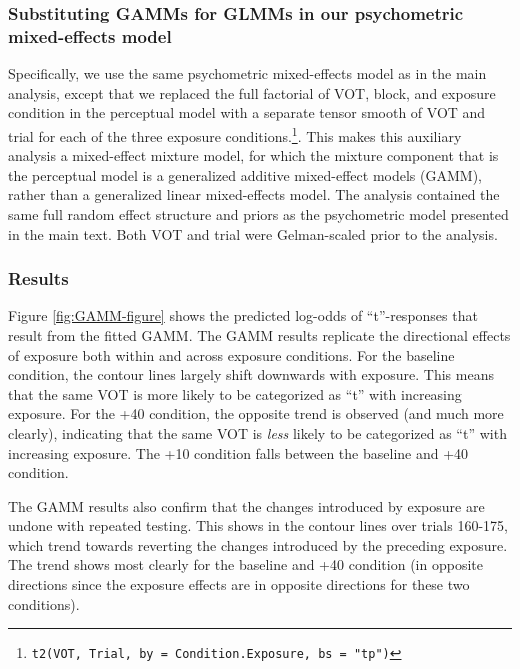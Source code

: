 \documentclass[
  11pt,
  man,mask,floatsintext]{apa6}
\begin{document}
\subsubsection{Substituting GAMMs for GLMMs in our psychometric mixed-effects model}\label{substituting-gamms-for-glmms-in-our-psychometric-mixed-effects-model}

Specifically, we use the same psychometric mixed-effects model as in the main analysis, except that we replaced the full factorial of VOT, block, and exposure condition in the perceptual model with a separate tensor smooth of VOT and trial for each of the three exposure conditions.\footnote{\texttt{t2(VOT,\ Trial,\ by\ =\ Condition.Exposure,\ bs\ =\ "tp")}}. This makes this auxiliary analysis a mixed-effect mixture model, for which the mixture component that is the perceptual model is a generalized additive mixed-effect models (GAMM), rather than a generalized linear mixed-effects model. The analysis contained the same full random effect structure and priors as the psychometric model presented in the main text. Both VOT and trial were Gelman-scaled prior to the analysis.

\subsubsection{Results}\label{results}

Figure \ref{fig:GAMM-figure} shows the predicted log-odds of ``t''-responses that result from the fitted GAMM. The GAMM results replicate the directional effects of exposure both within and across exposure conditions. For the baseline condition, the contour lines largely shift downwards with exposure. This means that the same VOT is more likely to be categorized as ``t'' with increasing exposure. For the +40 condition, the opposite trend is observed (and much more clearly), indicating that the same VOT is \emph{less} likely to be categorized as ``t'' with increasing exposure. The +10 condition falls between the baseline and +40 condition.

The GAMM results also confirm that the changes introduced by exposure are undone with repeated testing. This shows in the contour lines over trials 160-175, which trend towards reverting the changes introduced by the preceding exposure. The trend shows most clearly for the baseline and +40 condition (in opposite directions since the exposure effects are in opposite directions for these two conditions).
\end{document}

